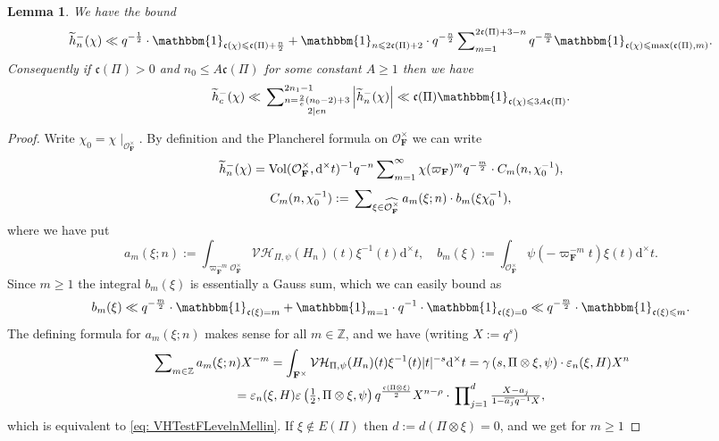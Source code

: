 \documentclass[A4]{amsart}
\def\leq{\leqslant}
\def\geq{\geqslant}
\newtheorem{lemma}      [theorem]{Lemma}
\numberwithin{equation}{section} \everymath{\displaystyle}
\newcommand{\Z}{\mathbb{Z}}
\newcommand{\id}{\mathbbm{1}}
\newcommand{\ud}{\mathrm{d}}
\newcommand{\F}{\mathbf{F}}
\newcommand{\vO}{\mathcal{O}}
\newcommand{\norm}[1][\cdot]{\lvert #1 \rvert}
\newcommand{\extnorm}[1]{\left\lvert #1 \right\rvert}
\newcommand{\VorH}{\mathcal{VH}}
\newcommand{\cond}{\mathfrak{c}}
\newcommand{\condL}{\mathfrak{\rho}}
\newcommand{\Vol}{{\rm Vol}}
\begin{document}
\begin{lemma} \label{lem: DWt-TrivBd}
	We have the bound 
	$$ \widetilde{h}_n^-(\chi) \ll q^{-\frac{1}{2}} \cdot \id_{\cond(\chi) \leq \cond(\Pi)+\frac{n}{2}} + \id_{n \leq 2\cond(\Pi)+2} \cdot q^{-\frac{n}{2}} \sideset{}{_{m=1}^{2\cond(\Pi)+3-n}} \sum q^{-\frac{m}{2}} \id_{\cond(\chi) \leq \max(\cond(\Pi),m)}. $$
	Consequently if $\cond(\Pi) > 0$ and $n_0 \leq A \cond(\Pi)$ for some constant $A \geq 1$ then we have
	$$ \widetilde{h}_c^-(\chi) \ll \sideset{}{_{\substack{n=\frac{2}{e}(n_0-2)+3 \\ 2 \mid en}}^{2n_1-1}} \sum \extnorm{\widetilde{h}_n^-(\chi)} \ll \cond(\Pi) \id_{\cond(\chi) \leq 3A \cond(\Pi)}. $$
\end{lemma}
\begin{proof}
	Write $\chi_0 = \chi \mid_{\vO_{\F}^{\times}}$. By definition and the Plancherel formula on $\vO_{\F}^{\times}$ we can write
	$$ \widetilde{h}_n^-(\chi) = \Vol(\vO_{\F}^{\times}, \ud^{\times}t)^{-1} q^{-n} \sideset{}{_{m=1}^{\infty}} \sum \chi(\varpi_{\F})^m q^{-\frac{m}{2}} \cdot C_m(n, \chi_0^{-1}),$$
	$$ C_m(n, \chi_0^{-1}) := \sideset{}{_{\xi \in \widehat{\vO_{\F}^{\times}}}} \sum a_m(\xi;n) \cdot b_m(\xi \chi_0^{-1}), $$
	where we have put
	$$ a_m(\xi;n) := \int_{\varpi_{\F}^{-m} \vO_{\F}^{\times}} \VorH_{\Pi,\psi}(H_n)(t) \xi^{-1}(t) \ud^{\times} t, \quad b_m(\xi) := \int_{\vO_{\F}^{\times}} \psi(-\varpi_{\F}^{-m}t) \xi(t) \ud^{\times} t. $$
	Since $m \geq 1$ the integral $b_m(\xi)$ is essentially a Gauss sum, which we can easily bound as
\begin{equation} \label{eq: bmBd}
	b_m(\xi) \ll q^{-\frac{m}{2}} \cdot \id_{\cond(\xi)=m} + \id_{m=1} \cdot q^{-1} \cdot \id_{\cond(\xi)=0} \ll q^{-\frac{m}{2}} \cdot \id_{\cond(\xi) \leq m}.
\end{equation}
	The defining formula for $a_m(\xi;n)$ makes sense for all $m \in \Z$, and we have (writing $X:=q^s$)
\begin{multline*}
	\sideset{}{_{m \in \Z}} \sum a_m(\xi;n) X^{-m} = \int_{\F^{\times}} \VorH_{\Pi,\psi}(H_n)(t) \xi^{-1}(t) \norm[t]^{-s} \ud^{\times} t = \gamma \left( s, \Pi \otimes \xi, \psi \right) \cdot \varepsilon_n(\xi, H) X^n \\
	= \varepsilon_n(\xi, H) \varepsilon \left( \tfrac{1}{2}, \Pi \otimes \xi, \psi \right) q^{\frac{\cond(\Pi \otimes \xi)}{2}} X^{n-\condL} \cdot \sideset{}{_{j=1}^d} \prod \tfrac{X-a_j}{1-\overline{a_j}q^{-1}X},
\end{multline*}
	which is equivalent to \eqref{eq: VHTestFLevelnMellin}. If $\xi \notin E(\Pi)$ then $d:=d(\Pi \otimes \xi)=0$, and we get for $m \geq 1$

\end{proof}
\end{document}
